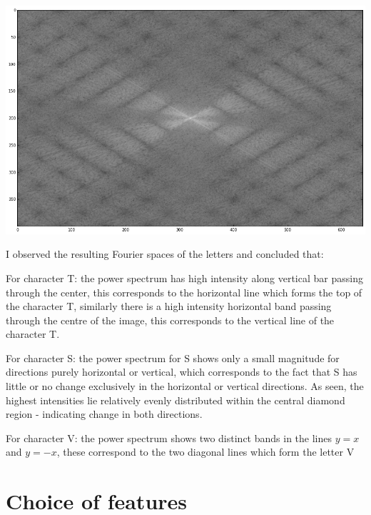 \documentclass[12px]{article}
\begin{document}
\begin{flushleft}
\includegraphics[scale=0.25]{fourierV}

\newpage


I observed the resulting Fourier spaces of the letters and concluded that:

\smallskip

For character T: the power spectrum has high intensity along vertical bar passing through the center, this corresponds to the horizontal
line which forms the top of the character T, similarly there is a high intensity horizontal band passing through the centre of the image,
this corresponds to the vertical line of the character T.

\smallskip

For character S: the power spectrum for S shows only a small magnitude for directions purely horizontal or vertical, which corresponds
to the fact that S has little or no change exclusively in the horizontal or vertical directions. As seen, the highest intensities lie
relatively evenly distributed within the central diamond region - indicating change in both directions.

\smallskip

For character V: the power spectrum shows two distinct bands in the lines $ y = x$ and $y = -x$, these
correspond to the two diagonal lines which form the letter V

\smallskip




\section{Choice of features}


\end{flushleft}
\end{document}
